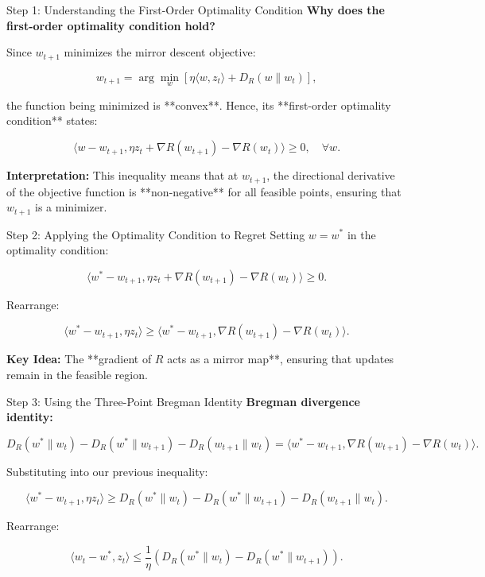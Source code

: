 \documentclass[handout]{beamer}
\begin{document}
\begin{small}
\begin{frame}{Step 1: Understanding the First-Order Optimality Condition}
\textbf{Why does the first-order optimality condition hold?}

Since \( w_{t+1} \) minimizes the mirror descent objective:

\[
w_{t+1} = \arg\min_{w} \left[ \eta \langle w, z_t \rangle + D_R(w \| w_t) \right],
\]

the function being minimized is **convex**. Hence, its **first-order optimality condition** states:

\[
\langle w - w_{t+1}, \eta z_t + \nabla R(w_{t+1}) - \nabla R(w_t) \rangle \geq 0, \quad \forall w.
\]

\textbf{Interpretation:} This inequality means that at \( w_{t+1} \), the directional derivative of the objective function is **non-negative** for all feasible points, ensuring that \( w_{t+1} \) is a minimizer.
\end{frame}

\begin{frame}{Step 2: Applying the Optimality Condition to Regret}
Setting \( w = w^* \) in the optimality condition:

\[
\langle w^* - w_{t+1}, \eta z_t + \nabla R(w_{t+1}) - \nabla R(w_t) \rangle \geq 0.
\]

Rearrange:

\[
\langle w^* - w_{t+1}, \eta z_t \rangle \geq \langle w^* - w_{t+1}, \nabla R(w_{t+1}) - \nabla R(w_t) \rangle.
\]

\textbf{Key Idea:} The **gradient of \( R \) acts as a mirror map**, ensuring that updates remain in the feasible region.
\end{frame}

\begin{frame}{Step 3: Using the Three-Point Bregman Identity}
\textbf{Bregman divergence identity:}

\[
D_R(w^* \| w_t) - D_R(w^* \| w_{t+1}) - D_R(w_{t+1} \| w_t) = \langle w^* - w_{t+1}, \nabla R(w_{t+1}) - \nabla R(w_t) \rangle.
\]

Substituting into our previous inequality:

\[
\langle w^* - w_{t+1}, \eta z_t \rangle \geq D_R(w^* \| w_t) - D_R(w^* \| w_{t+1}) - D_R(w_{t+1} \| w_t).
\]

Rearrange:

\[
\langle w_t - w^*, z_t \rangle \leq \frac{1}{\eta} \left(D_R(w^* \| w_t) - D_R(w^* \| w_{t+1}) \right).
\]
\end{frame}


\end{small}
\end{document}
